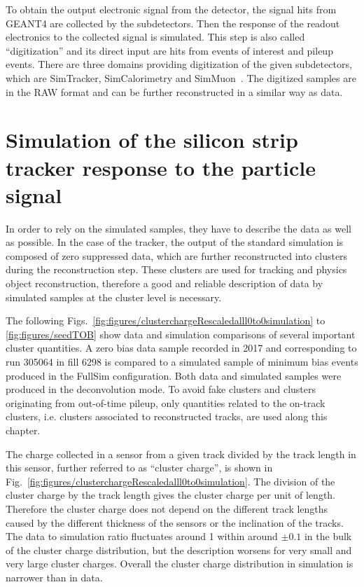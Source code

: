 To obtain the output electronic signal from the detector, the signal hits from GEANT4 are collected by the subdetectors. Then the response of the readout electronics to the collected signal is simulated. This step is also called ``digitization'' and its direct input are hits from events of interest and pileup events. There are three domains providing digitization of the given subdetectors, which are SimTracker, SimCalorimetry and SimMuon~\cite{website:simdigi}. The digitized samples are in the RAW format and can be further reconstructed in a similar way as data.


\section{Simulation of the silicon strip tracker response to the particle signal~\label{sec:trackerSimu}}

In order to rely on the simulated samples, they have to describe the data as well as possible. In the case of the tracker, the output of the standard simulation is composed of zero suppressed data, which are further reconstructed into clusters during the reconstruction step. These clusters are used for tracking and physics object reconstruction, therefore a good and reliable description of data by simulated samples at the cluster level is necessary.

The following Figs.~\ref{fig:figures/clusterchargeRescaledalll0to0simulation} to \ref{fig:figures/seedTOB} show data and simulation comparisons of several important cluster quantities. A zero bias data sample recorded in 2017 and corresponding to run 305064 in fill 6298 is compared to a simulated sample of minimum bias events produced in the FullSim configuration. Both data and simulated samples were produced in the deconvolution mode. To avoid fake clusters and clusters originating from out-of-time pileup, only quantities related to the on-track clusters, i.e. clusters associated to reconstructed tracks, are used along this chapter.
 
The charge collected in a sensor from a given track divided by the track length in this sensor, further referred to as ``cluster charge'', is shown in Fig.~\ref{fig:figures/clusterchargeRescaledalll0to0simulation}. The division of the cluster charge by the track length gives the cluster charge per unit of length. Therefore the cluster charge does not depend on the different track lengths caused by the different thickness of the sensors or the inclination of the tracks.  The data to simulation ratio fluctuates around 1 within around $\pm 0.1$ in the bulk of the cluster charge distribution, but the description worsens for very small and very large cluster charges. Overall the cluster charge distribution in simulation is narrower than in data. 


